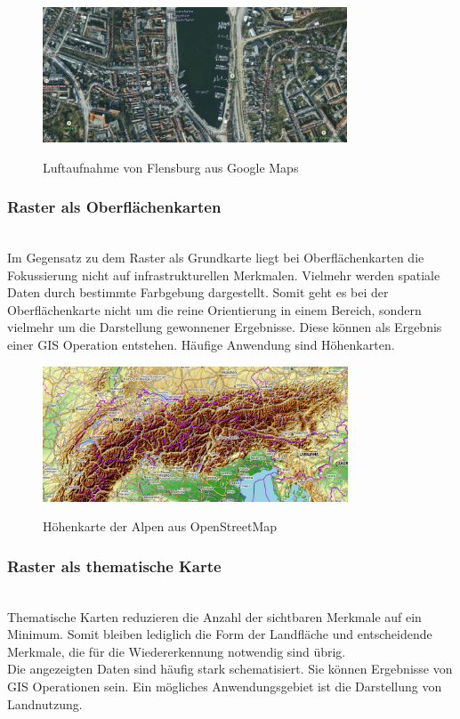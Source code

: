 \documentclass[10pt,conference,compsocconf]{IEEEtran}
\begin{document}
\begin{figure}[H]
  \centering
  	\includegraphics[height=114pt]{img/gis_Flensburg_raster}\\
  \caption[]{Luftaufnahme von Flensburg aus Google Maps}
  \label{img:gis_Flensburg_raster}
\end{figure}

\subsubsection{Raster als Oberflächenkarten}\hspace*{\fill} \\
Im Gegensatz zu dem Raster als Grundkarte liegt bei Oberflächenkarten die Fokussierung nicht auf infrastrukturellen Merkmalen. Vielmehr werden spatiale Daten durch bestimmte Farbgebung dargestellt. Somit geht es bei der Oberflächenkarte nicht um die reine Orientierung in einem Bereich, sondern vielmehr um die Darstellung gewonnener Ergebnisse. Diese können als Ergebnis einer GIS Operation entstehen. Häufige Anwendung sind Höhenkarten.

\begin{figure}[H]
  \centering
  	\includegraphics[height=114pt]{img/gis_alps}\\
  \caption[]{Höhenkarte der Alpen aus OpenStreetMap}
  \label{img:gis_alps}
\end{figure}

\subsubsection{Raster als thematische Karte}\hspace*{\fill} \\
Thematische Karten reduzieren die Anzahl der sichtbaren Merkmale auf ein Minimum. Somit bleiben lediglich die Form der Landfläche und entscheidende Merkmale, die für die Wiedererkennung notwendig sind übrig.\\
Die angezeigten Daten sind häufig stark schematisiert. Sie können Ergebnisse von GIS Operationen sein. Ein mögliches Anwendungsgebiet ist die Darstellung von Landnutzung. 
\end{document}
